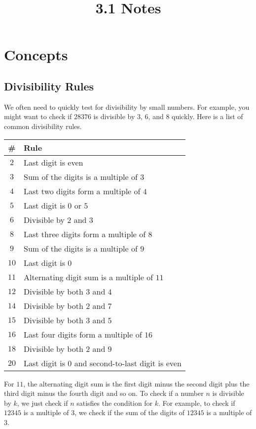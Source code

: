 \documentclass{article}
\title{3.1 Notes}
\author{}
\date{}
\begin{document}
\maketitle

\section*{Concepts}
\begin{multicols}{2}
	
	\subsection*{Divisibility Rules}
	We often need to quickly test for divisibility by small numbers.
	For example, you might want to check if $28376$ is divisible by $3$, $6$, and $8$ quickly.
	Here is a list of common divisibility rules.
	
	\begin{tabular}{|c|l|}
		\hline
		\# & Rule \\
		\hline
		$2$    & Last digit is even \\
		$3$    & Sum of the digits is a multiple of $3$ \\
		$4$    & Last two digits form a multiple of $4$ \\
		$5$    & Last digit is $0$ or $5$ \\
		$6$    & Divisible by $2$ and $3$ \\
		$8$    & Last three digits form a multiple of $8$ \\
		$9$    & Sum of the digits is a multiple of $9$ \\
		$10$   & Last digit is $0$ \\
		$11$   & Alternating digit sum is a multiple of $11$ \\
		$12$   & Divisible by both $3$ and $4$ \\
		$14$   & Divisible by both $2$ and $7$ \\
		$15$   & Divisible by both $3$ and $5$ \\
		$16$   & Last four digits form a multiple of $16$ \\
		$18$   & Divisible by both $2$ and $9$ \\
		$20$   & Last digit is $0$ and second-to-last digit is even \\
		\hline
	\end{tabular}
	
	For $11$, the alternating digit sum is the first digit minus the second digit plus the
	third digit minus the fourth digit and so on.
	To check if a number $n$ is divisible by $k$, we just check if $n$ satisfies the condition
	for $k$.
	For example, to check if $12345$ is a multiple of $3$,
	we check if the sum of the digits of $12345$ is a multiple of $3$.
	

\end{multicols}
\end{document}
